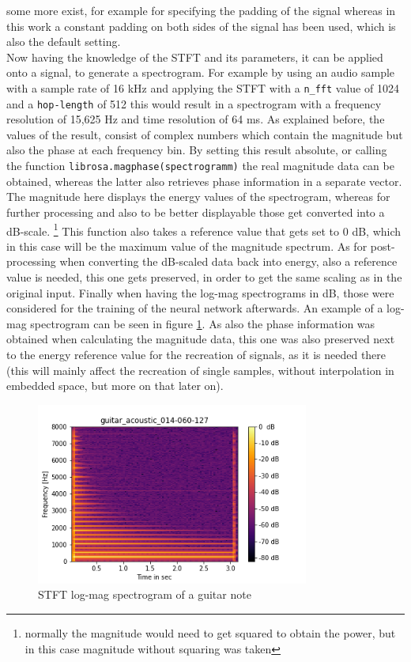 some more exist, for example for specifying the padding of the signal whereas in this work a constant padding on both sides of the signal has been used, which is also the default setting. \\

Now having the knowledge of the STFT and its parameters, it can be applied onto a signal, to generate a spectrogram. For example by using an audio sample with a sample rate of 16 kHz and applying the STFT with a \texttt{n\_fft} value of 1024 and a \texttt{hop-length} of 512 this would result in a spectrogram with a frequency resolution of 15,625 Hz and time resolution of 64 ms. As explained before, the values of the result, consist of complex numbers which contain the magnitude but also the phase at each frequency bin. By setting this result absolute, or calling the function \texttt{librosa.magphase(spectrogramm)} the real magnitude data can be obtained, whereas the latter also retrieves phase information in a separate vector. The magnitude here displays the energy values of the spectrogram, whereas for further processing and also to be better displayable those get converted into a dB-scale. \footnote{normally the magnitude would need to get squared to obtain the power, but in this case magnitude without squaring was taken} This function also takes a reference value that gets set to 0 dB, which in this case will be the maximum value of the magnitude spectrum. As for post-processing when converting the dB-scaled data back into energy, also a reference value is needed, this one gets preserved, in order to get the same scaling as in the original input. Finally when having the log-mag spectrograms in dB, those were considered for the training of the neural network afterwards. An example of a log-mag spectrogram can be seen in figure \ref{fig:spectrogram}. As also the phase information was obtained when calculating the magnitude data, this one was also preserved next to the energy reference value for the recreation of signals, as it is needed there (this will mainly affect the recreation of single samples, without interpolation in embedded space, but more on that later on).


 \begin{figure}[htb!]
	\caption{STFT log-mag spectrogram of a guitar note}
	\label{fig:spectrogram}
	\centering
	\includegraphics[width=0.8\textwidth]{images/approach/guitar_acoustic_014-060-127.png}
\end{figure}

